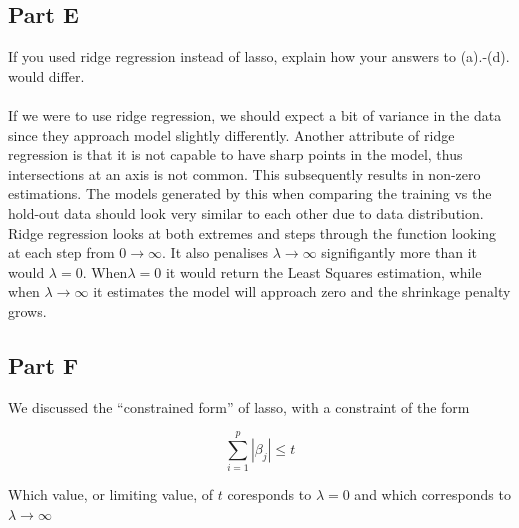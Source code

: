 \documentclass[12pt]{article}
\begin{document}
\subsection{Part E}
If you used ridge regression instead of lasso, explain how your answers to (a).-(d). would differ. \\\\
If we were to use ridge regression, we should expect a bit of variance in the data since they approach model slightly differently. Another attribute of ridge regression is that it is not capable to have sharp points in the model, thus intersections at an axis is not common. This subsequently results in non-zero estimations. The models generated by this when comparing the training vs the hold-out data should look very similar to each other due to data distribution. Ridge regression looks at both extremes and steps through the function looking at each step from $0\rightarrow\infty$. It also penalises $\lambda\rightarrow\infty$ signifigantly more than it would $\lambda = 0$. When$\lambda = 0$ it would return the Least Squares estimation, while when $\lambda\rightarrow\infty$ it estimates the model will approach zero and the shrinkage penalty grows.

\subsection{Part F}
We discussed the “constrained form” of lasso, with a constraint of the form
\begin{center}
    \[\sum_{i=1}^{p}|\beta_j| \leq t\]
\end{center}
Which value, or limiting value, of $t$ coresponds to $\lambda = 0$ and which corresponds to $\lambda \rightarrow \infty$\\\\




\pagebreak
\end{document}
